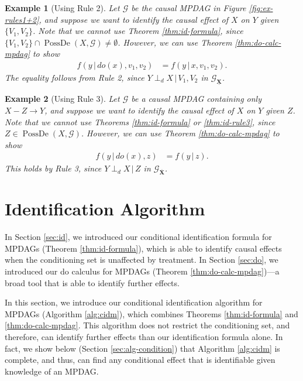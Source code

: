 \documentclass[11pt]{article}
\DeclareMathOperator{\PossDe}{PossDe}
\newtheorem{example}{Example}
\newcommand{\mb}[1]{\mathbf{#1}}
\newcommand{\dsepp}{\perp_{d}}
\newcommand{\g}[1][G]{\mathcal{#1}}
\begin{document}
\begin{example}[Using Rule 2]
\label{ex:do-rule2}
    Let $\g$ be the causal MPDAG in Figure \ref{fig:ex-rules1+2}, and suppose we want to identify the causal effect of $X$ on $Y$ given $\{V_1,V_2\}$. Note that we cannot use Theorem \ref{thm:id-formula}, since $\{V_1,V_2\} \cap \PossDe(X, \g) \neq \emptyset$. However, we can use Theorem \ref{thm:do-calc-mpdag} to show
    \begin{align*}
        f(y \,|\, do(x), v_1, v_2)
            &= f(y \,|\, x, v_1, v_2).
    \end{align*}
    The equality follows from Rule 2, since $Y \dsepp X \,|\, V_1, V_2$ in $\g_{\underline{\mb{X}}}$.
\end{example}


\begin{example}[Using Rule 3]
\label{ex:do-rule3}
    Let $\g$ be a causal MPDAG containing only $X - Z \to Y$, and suppose we want to identify the causal effect of $X$ on $Y$ given $Z$. Note that we cannot use Theorems \ref{thm:id-formula} or \ref{thm:id-rule3}, since $Z \in \PossDe(X, \g)$. However, we can use Theorem \ref{thm:do-calc-mpdag} to show
    \begin{align*}
        f(y \,|\, do(x), z)
            &= f(y \,|\, z).
    \end{align*}    
    This holds by Rule 3, since $Y \dsepp X \,|\, Z$ in $\g_{\overline{\mb{X}}}$.
\end{example}











\section{Identification Algorithm}
\label{sec:alg}

In Section \ref{sec:id}, we introduced our conditional identification formula for MPDAGs (Theorem \ref{thm:id-formula}), which is able to identify causal effects when the conditioning set is unaffected by treatment. In Section \ref{sec:do}, we introduced our do calculus for MPDAGs (Theorem \ref{thm:do-calc-mpdag})---a broad tool that is able to identify further effects.

In this section, we introduce our conditional identification algorithm for MPDAGs (Algorithm \ref{alg:cidm}), which combines Theorems \ref{thm:id-formula} and \ref{thm:do-calc-mpdag}. This algorithm does not restrict the conditioning set, and therefore, can identify further effects than our identification formula alone. In fact, we show below (Section \ref{sec:alg-condition}) that Algorithm \ref{alg:cidm} is complete, and thus, can find any conditional effect that is identifiable given knowledge of an MPDAG.
\end{document}
